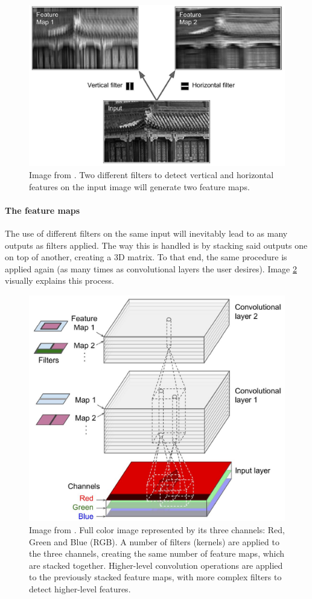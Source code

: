 \documentclass[../main.tex]{subfiles}
\begin{document}
\begin{figure}[H]
    \centering
    \includegraphics[width=0.8\linewidth]{images/filters_example.JPG}
    \caption{Image from \cite{hands_on_ML_Aurelien}. Two different filters to detect vertical and horizontal features on the input image will generate two feature maps.}
    \label{fig:filters_example}
\end{figure}


\paragraph{The feature maps}
The use of different filters on the same input will inevitably lead to as many outputs as filters applied. The way this is handled is by stacking said outputs one on top of another, creating a 3D matrix. To that end, the same procedure is applied again (as many times as convolutional layers the user desires). Image \ref{fig:conv_layers_and_feature_maps} visually explains this process.

\begin{figure}[H]
    \centering
    \includegraphics[width=0.8\linewidth]{images/conv_layers_and_feature_maps.JPG}
    \caption{Image from \cite{hands_on_ML_Aurelien}. Full color image represented by its three channels: Red, Green and Blue (RGB). A number of filters (kernels) are applied to the three channels, creating the same number of feature maps, which are stacked together. Higher-level convolution operations are applied to the previously stacked feature maps, with more complex filters to detect higher-level features.}
    \label{fig:conv_layers_and_feature_maps}
\end{figure}
\end{document}
